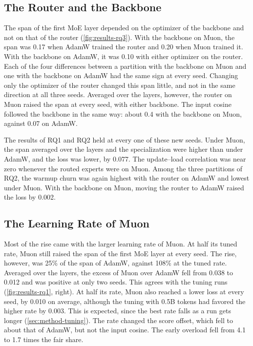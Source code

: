\subsection{The Router and the Backbone}
\label{sec:results-rq3-backbone}
The span of the first MoE layer depended on the optimizer of the backbone and not on that of the router (\cref{fig:results-rq3}). With the backbone on Muon, the span was 0.17 when AdamW trained the router and 0.20 when Muon trained it. With the backbone on AdamW, it was 0.10 with either optimizer on the router. Each of the four differences between a partition with the backbone on Muon and one with the backbone on AdamW had the same sign at every seed. Changing only the optimizer of the router changed this span little, and not in the same direction at all three seeds. Averaged over the layers, however, the router on Muon raised the span at every seed, with either backbone. The input cosine followed the backbone in the same way: about 0.4 with the backbone on Muon, against 0.07 on AdamW.

The results of RQ1 and RQ2 held at every one of these new seeds. Under Muon, the span averaged over the layers and the specialization were higher than under AdamW, and the loss was lower, by 0.077. The update--load correlation was near zero whenever the routed experts were on Muon. Among the three partitions of RQ2, the warmup churn was again highest with the router on AdamW and lowest under Muon. With the backbone on Muon, moving the router to AdamW raised the loss by 0.002.

\subsection{The Learning Rate of Muon}
\label{sec:results-rq3-rate}
Most of the rise came with the larger learning rate of Muon. At half its tuned rate, Muon still raised the span of the first MoE layer at every seed. The rise, however, was 25\% of the span of AdamW, against 108\% at the tuned rate. Averaged over the layers, the excess of Muon over AdamW fell from 0.038 to 0.012 and was positive at only two seeds. This agrees with the tuning runs (\cref{fig:results-rq1}, right). At half its rate, Muon also reached a lower loss at every seed, by 0.010 on average, although the tuning with 0.5B tokens had favored the higher rate by 0.003. This is expected, since the best rate falls as a run gets longer (\cref{sec:method-tuning}). The rate changed the score offset, which fell to about that of AdamW, but not the input cosine. The early overload fell from 4.1 to 1.7 times the fair share.


